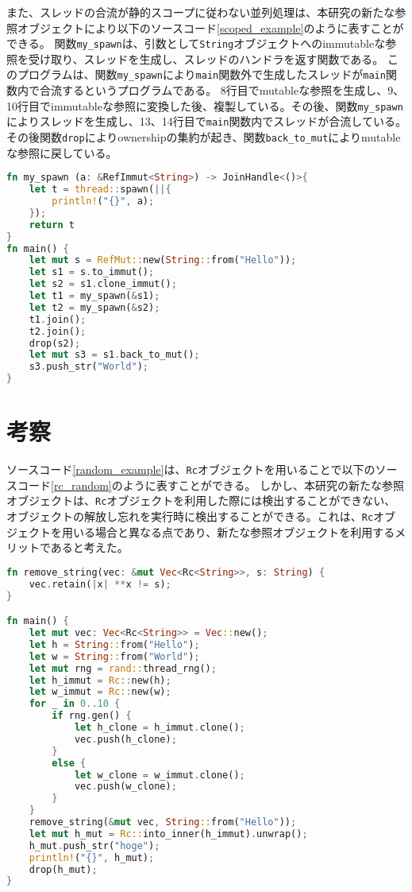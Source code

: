 \documentclass{sumiilab-paper}
\theoremstyle{mystyle}
\numberwithin{definition}{chapter} %
\begin{document}
また、スレッドの合流が静的スコープに従わない並列処理は、本研究の新たな参照オブジェクトにより以下のソースコード\ref{scoped_example}のように表すことができる。
関数\texttt{my\_spawn}は、引数として\texttt{String}オブジェクトへのimmutableな参照を受け取り、スレッドを生成し、スレッドのハンドラを返す関数である。
このプログラムは、関数\texttt{my\_spawn}により\texttt{main}関数外で生成したスレッドが\texttt{main}関数内で合流するというプログラムである。
8行目でmutableな参照を生成し、9、10行目でimmutableな参照に変換した後、複製している。その後、関数\texttt{my\_spawn}によりスレッドを生成し、13、14行目で\texttt{main}関数内でスレッドが合流している。その後関数\texttt{drop}によりownershipの集約が起き、関数\texttt{back\_to\_mut}によりmutableな参照に戻している。
\begin{lstlisting}[language=Rust, caption=新たな参照オブジェクトを用いた並列処理の例, label=scoped_example, captionpos=b]
fn my_spawn (a: &RefImmut<String>) -> JoinHandle<()>{
    let t = thread::spawn(||{
        println!("{}", a);
    });
    return t
}
fn main() {
    let mut s = RefMut::new(String::from("Hello"));
    let s1 = s.to_immut();
    let s2 = s1.clone_immut(); 
    let t1 = my_spawn(&s1);
    let t2 = my_spawn(&s2); 
    t1.join();
    t2.join();
    drop(s2);
    let mut s3 = s1.back_to_mut();
    s3.push_str("World");
}
\end{lstlisting}
\chapter{考察}
ソースコード\ref{random_example}は、\texttt{Rc}オブジェクトを用いることで以下のソースコード\ref{rc_random}のように表すことができる。
しかし、本研究の新たな参照オブジェクトは、\texttt{Rc}オブジェクトを利用した際には検出することができない、オブジェクトの解放し忘れを実行時に検出することができる。これは、\texttt{Rc}オブジェクトを用いる場合と異なる点であり、新たな参照オブジェクトを利用するメリットであると考えた。
\begin{lstlisting}[language=Rust, caption=新たな参照オブジェクトを用いた並列処理の例, label=rc_random, captionpos=b]
fn remove_string(vec: &mut Vec<Rc<String>>, s: String) {
    vec.retain(|x| **x != s);
}

fn main() {
    let mut vec: Vec<Rc<String>> = Vec::new();
    let h = String::from("Hello");
    let w = String::from("World");
    let mut rng = rand::thread_rng();
    let h_immut = Rc::new(h);
    let w_immut = Rc::new(w);
    for _ in 0..10 {
        if rng.gen() {
            let h_clone = h_immut.clone();
            vec.push(h_clone);
        }
        else {
            let w_clone = w_immut.clone();
            vec.push(w_clone);
        }
    }
    remove_string(&mut vec, String::from("Hello"));
    let mut h_mut = Rc::into_inner(h_immut).unwrap();
    h_mut.push_str("hoge");
    println!("{}", h_mut);
    drop(h_mut);
}
\end{lstlisting}
\end{document}
